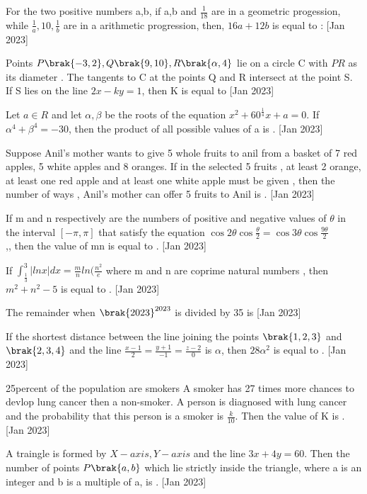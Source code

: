 \iffalse
  \title{2023}
  \author{ai24btech11005}
  \section{integer}
\fi
    \item For the two positive numbers a,b, if a,b and $\frac{1}{18}$ are in a geometric progession, while $\frac{1}{a},10,\frac{1}{b}$ are in a arithmetic progression, then, $16a+12b$ is equal to :
    \hfill{[Jan 2023]}
    \item Points $P\brak{-3,2},Q\brak{9,10},R\brak{\alpha,4}$ lie on a circle C with $PR$ as its diameter . The tangents to C at the points Q and R intersect at the point S. If S lies on the line $2x-ky=1$, then K is equal to 
     \hfill{[Jan 2023]}
    \item Let $a\in R$ and let $\alpha,\beta$ be the roots of the equation $x^2+60^{\frac{1}{4}}x+a=0$. If $\alpha^4 +\beta^4=-30$, then the product of all possible values of a is .
 \hfill{[Jan 2023]}
    \item Suppose Anil's mother wants to give 5 whole fruits to anil from a basket of 7 red apples, 5 white apples and 8 oranges. If in the selected 5 fruits , at least 2 orange, at least one red apple and at least one white apple must be given , then the number of ways , Anil's  mother can offer 5 fruits to Anil is   .
     \hfill{[Jan 2023]}
    \item If m and n respectively are the numbers of positive and negative values of $\theta$ in the interval $[-\pi,\pi]$ that satisfy the equation $\cos 2\theta \cos{\frac{\theta}{2}}=\cos 3\theta \cos{\frac{9\theta}{2}}$ \\,, then the value of mn is equal to .
     \hfill{[Jan 2023]}

    \item If $\int_{\frac{1}{3}}^{3} |lnx|dx=\frac{m}{n}ln(\frac{n^2}{e}$ where m and n are coprime natural numbers , then $m^2+n^2-5$ is equal to .
     \hfill{[Jan 2023]}
    \item The remainder when $\brak{2023}^{2023}$ is divided by 35 is 
     \hfill{[Jan 2023]}

    \item If the shortest distance between the line joining the points $\brak{1,2,3}$ and $\brak{2,3,4}$ and the line $\frac{x-1}{2}=\frac{y+1}{-1}=\frac{z-2}{0}$ is $\alpha$, then $28\alpha^2$ is equal to . 
     \hfill{[Jan 2023]}
    \item 25percent of the population are smokers A smoker has 27 times more chances to devlop lung cancer then a non-smoker. A person is diagnosed with lung cancer and the probability that this person is a smoker is $\frac{k}{10}.$ Then the value of K is .
     \hfill{[Jan 2023]}
    \item A traingle is formed by $X-axis,Y-axis$ and the line $3x+4y=60$. Then the number of points $P\brak{a,b}$  which lie strictly inside  the triangle, where a is an integer and b is a multiple of a, is .
     \hfill{[Jan 2023]}
